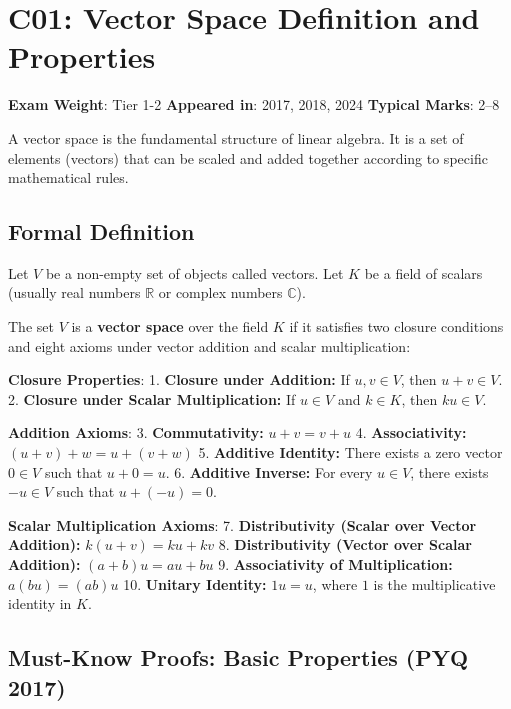 \documentclass[
]{article}
\renewenvironment{quote}
  {\begin{tcolorbox}[
     colback=calloutbg,
     colframe=calloutframe,
     colupper=callouttext,
     arc=3pt,
     boxrule=0.5pt,
     leftrule=0.5pt,
     borderline west={3pt}{0pt}{calloutaccent},
     left=8pt,
     right=8pt,
     top=6pt,
     bottom=6pt
   ]}
  {\end{tcolorbox}}
\begin{document}
\section{C01: Vector Space Definition and
Properties}\label{c01-vector-space-definition-and-properties}

\begin{quote}
\textbf{Exam Weight}: Tier 1-2 \textbar{} \textbf{Appeared in}: 2017,
2018, 2024 \textbar{} \textbf{Typical Marks}: 2--8
\end{quote}

A vector space is the fundamental structure of linear algebra. It is a
set of elements (vectors) that can be scaled and added together
according to specific mathematical rules.

\subsection{Formal Definition}\label{formal-definition}

Let \(V\) be a non-empty set of objects called vectors. Let \(K\) be a
field of scalars (usually real numbers \(\mathbb{R}\) or complex numbers
\(\mathbb{C}\)).

The set \(V\) is a \textbf{vector space} over the field \(K\) if it
satisfies two closure conditions and eight axioms under vector addition
and scalar multiplication:

\textbf{Closure Properties}: 1. \textbf{Closure under Addition:} If
\(u, v \in V\), then \(u + v \in V\). 2. \textbf{Closure under Scalar
Multiplication:} If \(u \in V\) and \(k \in K\), then \(k u \in V\).

\textbf{Addition Axioms}: 3. \textbf{Commutativity:} \(u + v = v + u\)
4. \textbf{Associativity:} \((u + v) + w = u + (v + w)\) 5.
\textbf{Additive Identity:} There exists a zero vector \(0 \in V\) such
that \(u + 0 = u\). 6. \textbf{Additive Inverse:} For every \(u \in V\),
there exists \(-u \in V\) such that \(u + (-u) = 0\).

\textbf{Scalar Multiplication Axioms}: 7. \textbf{Distributivity (Scalar
over Vector Addition):} \(k(u + v) = ku + kv\) 8. \textbf{Distributivity
(Vector over Scalar Addition):} \((a + b)u = au + bu\) 9.
\textbf{Associativity of Multiplication:} \(a(bu) = (ab)u\) 10.
\textbf{Unitary Identity:} \(1u = u\), where \(1\) is the multiplicative
identity in \(K\).

\subsection{Must-Know Proofs: Basic Properties (PYQ
2017)}\label{must-know-proofs-basic-properties-pyq-2017}
\end{document}
